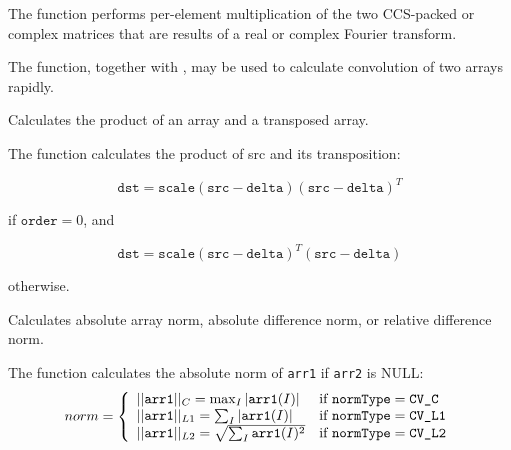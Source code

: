 The function performs per-element multiplication of the two CCS-packed or complex matrices that are results of a real or complex Fourier transform.

The function, together with , may be used to calculate convolution of two arrays rapidly.


Calculates the product of an array and a transposed array.


\begin{description}
\end{description}

The function calculates the product of src and its transposition:

\[
\texttt{dst}=\texttt{scale} (\texttt{src}-\texttt{delta}) (\texttt{src}-\texttt{delta})^T
\]

if $\texttt{order}=0$, and

\[
\texttt{dst}=\texttt{scale} (\texttt{src}-\texttt{delta})^T (\texttt{src}-\texttt{delta})
\]

otherwise.

Calculates absolute array norm, absolute difference norm, or relative difference norm.


\begin{description}
\end{description}

The function calculates the absolute norm of \texttt{arr1} if \texttt{arr2} is NULL:
\[
norm = \left\{ \begin{array}{l l} ||\texttt{arr1}||_C    = \max_I |\texttt{arr1}(I)| & \mbox{if $\texttt{normType} = \texttt{CV\_C}$}\\ ||\texttt{arr1}||_{L1} = \sum_I |\texttt{arr1}(I)| & \mbox{if $\texttt{normType} = \texttt{CV\_L1}$}\\ ||\texttt{arr1}||_{L2} = \sqrt{\sum_I \texttt{arr1}(I)^2} & \mbox{if $\texttt{normType} = \texttt{CV\_L2}$}\\ \end{array} \right.
\]

